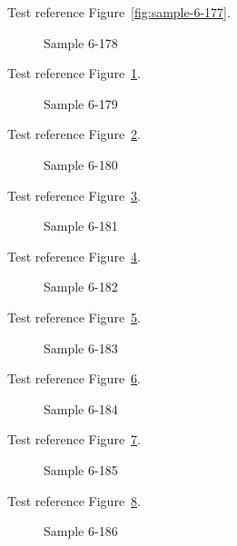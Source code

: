 Test reference Figure~\ref{fig:sample-6-177}.

\begin{figure}[tbhp]
\caption{Sample 6-178}
\label{fig:sample-6-178}
\end{figure}

Test reference Figure~\ref{fig:sample-6-178}.

\begin{figure}[tbhp]
\caption{Sample 6-179}
\label{fig:sample-6-179}
\end{figure}

Test reference Figure~\ref{fig:sample-6-179}.

\begin{figure}[tbhp]
\caption{Sample 6-180}
\label{fig:sample-6-180}
\end{figure}

Test reference Figure~\ref{fig:sample-6-180}.

\begin{figure}[tbhp]
\caption{Sample 6-181}
\label{fig:sample-6-181}
\end{figure}

Test reference Figure~\ref{fig:sample-6-181}.

\begin{figure}[tbhp]
\caption{Sample 6-182}
\label{fig:sample-6-182}
\end{figure}

Test reference Figure~\ref{fig:sample-6-182}.

\begin{figure}[tbhp]
\caption{Sample 6-183}
\label{fig:sample-6-183}
\end{figure}

Test reference Figure~\ref{fig:sample-6-183}.

\begin{figure}[tbhp]
\caption{Sample 6-184}
\label{fig:sample-6-184}
\end{figure}

Test reference Figure~\ref{fig:sample-6-184}.

\begin{figure}[tbhp]
\caption{Sample 6-185}
\label{fig:sample-6-185}
\end{figure}

Test reference Figure~\ref{fig:sample-6-185}.

\begin{figure}[tbhp]
\caption{Sample 6-186}
\label{fig:sample-6-186}
\end{figure}

